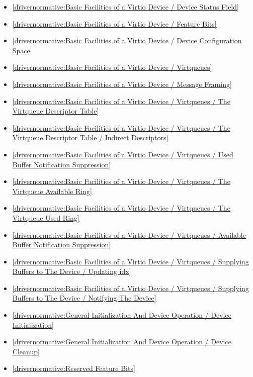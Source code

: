 \begin{itemize}
\item \ref{drivernormative:Basic Facilities of a Virtio Device / Device Status Field}
\item \ref{drivernormative:Basic Facilities of a Virtio Device / Feature Bits}
\item \ref{drivernormative:Basic Facilities of a Virtio Device / Device Configuration Space}
\item \ref{drivernormative:Basic Facilities of a Virtio Device / Virtqueues}
\item \ref{drivernormative:Basic Facilities of a Virtio Device / Message Framing}
\item \ref{drivernormative:Basic Facilities of a Virtio Device / Virtqueues / The Virtqueue Descriptor Table}
\item \ref{drivernormative:Basic Facilities of a Virtio Device / Virtqueues / The Virtqueue Descriptor Table / Indirect Descriptors}
\item \ref{drivernormative:Basic Facilities of a Virtio Device / Virtqueues / Used Buffer Notification Suppression}
\item \ref{drivernormative:Basic Facilities of a Virtio Device / Virtqueues / The Virtqueue Available Ring}
\item \ref{drivernormative:Basic Facilities of a Virtio Device / Virtqueues / The Virtqueue Used Ring}
\item \ref{drivernormative:Basic Facilities of a Virtio Device / Virtqueues / Available Buffer Notification Suppression}
\item \ref{drivernormative:Basic Facilities of a Virtio Device / Virtqueues / Supplying Buffers to The Device / Updating idx}
\item \ref{drivernormative:Basic Facilities of a Virtio Device / Virtqueues / Supplying Buffers to The Device / Notifying The Device}
\item \ref{drivernormative:General Initialization And Device Operation / Device Initialization}
\item \ref{drivernormative:General Initialization And Device Operation / Device Cleanup}
\item \ref{drivernormative:Reserved Feature Bits}
\end{itemize}

\label{sec:Conformance / Driver Conformance / PCI Driver Conformance}

